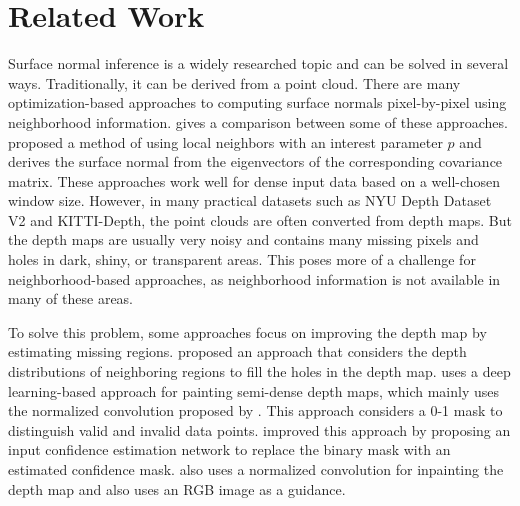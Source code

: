 
\chapter{Related Work} %

\label{ch:02} %

Surface normal inference is a widely researched topic and can be solved in several ways. Traditionally, it can be derived from a point cloud. There are many optimization-based approaches to computing surface normals pixel-by-pixel using neighborhood information. \cite{optimized-methods} gives a comparison between some of these approaches. \cite{Holzer.S} proposed a method of using local neighbors with an interest parameter $ p $ and derives the surface normal from the eigenvectors of the corresponding covariance matrix. These approaches work well for dense input data based on a well-chosen window size.
However, in many practical datasets such as NYU Depth Dataset V2 \cite{nyu} and KITTI-Depth\cite{kitti-depth}, the point clouds are often converted from depth maps.
But the depth maps are usually very noisy and contains many missing pixels and holes in dark, shiny, or transparent areas. This poses more of a challenge for neighborhood-based approaches, as neighborhood information is not available in many of these areas. 

To solve this problem, some approaches focus on improving the depth map by estimating missing regions. \cite{depth-inpainting-distribution} proposed an approach that considers the depth distributions of neighboring regions to fill the holes in the depth map. \cite{ncnn} uses a deep learning-based approach for painting semi-dense depth maps, which mainly uses the normalized convolution proposed by \cite{nconv}. This approach considers a 0-1 mask to distinguish valid and invalid data points. \cite{pncnn} improved this approach by proposing an input confidence estimation network to replace the binary mask with an estimated confidence mask. \cite{depth-enhance-guided} also uses a normalized convolution for inpainting the depth map and also uses an RGB image as a guidance. 







